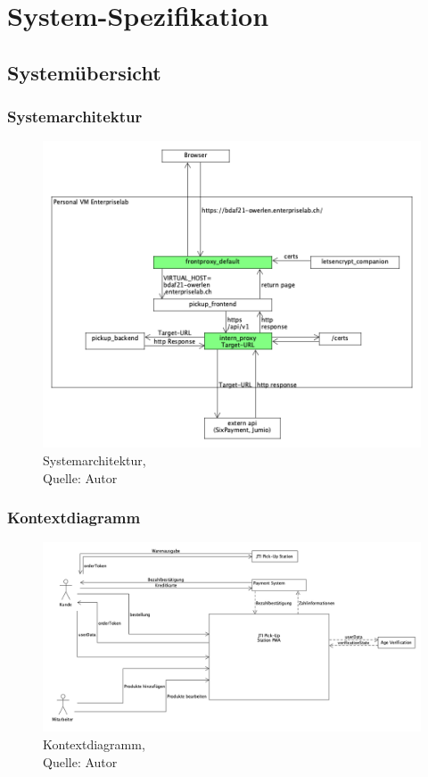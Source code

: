 \section{System-Spezifikation}\label{SystemSpezifikation}
\subsection{Systemübersicht}
\subsubsection{Systemarchitektur}
\begin{figure}[H]
    \centering
    \includegraphics[width=1\textwidth]{images/systemoverview.png}
    \caption[Systemarchitektur]{Systemarchitektur,\\ Quelle: Autor}
    \label{img: Systemarchitektur des Projektes}
\end{figure}
\newpage
\subsubsection{Kontextdiagramm}\label{Kontextdiagram}
\begin{figure}[H]
    \centering
   \includegraphics[width=1\textwidth]{images/kontextdiagramm.png}
    \caption[Kontextdiagramm]{Kontextdiagramm,\\ Quelle: Autor}
    \label{img: Kontextdiagramm des Projektes}
\end{figure}
\newpage
\newpage
